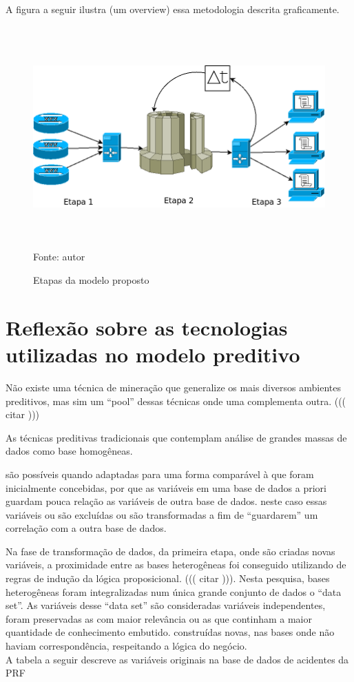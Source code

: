 A figura a seguir ilustra (um overview) essa metodologia descrita graficamente.

\begin{figure}[ht]
\centering
\caption{Etapas da modelo proposto}
\includegraphics[width=170mm, height=85mm]{Figuras/Cronograma/metodologiaGeral.png}\\
\tiny Fonte: autor
\end{figure}

\section{Reflexão sobre as tecnologias utilizadas no modelo preditivo}\label{result}

Não existe uma técnica de mineração que generalize os mais diversos ambientes preditivos, mas sim um ``pool'' 
dessas técnicas onde uma complementa outra. ((( citar )))

As técnicas preditivas tradicionais que contemplam análise de grandes massas de dados como base homogêneas.

são possíveis quando adaptadas para uma forma comparável à que
foram inicialmente concebidas, por que as variáveis em uma base de dados a priori guardam pouca relação as variáveis de outra base de dados.
neste caso essas variáveis ou são excluídas ou são transformadas a fim de ``guardarem'' um correlação com a outra base de dados. 

Na fase de transformação de dados, da primeira etapa, onde são criadas novas variáveis, a proximidade entre as
bases heterogêneas foi conseguido utilizando de regras de indução da lógica proposicional. ((( citar ))).
Nesta pesquisa, bases heterogêneas foram integralizadas num única grande conjunto de dados o ``data set''. As variáveis desse ``data set''
são consideradas variáveis independentes, foram preservadas as com maior relevância ou as que continham a maior quantidade de conhecimento
embutido.  construídas novas, nas bases onde não haviam correspondência, respeitando a lógica do negócio.\\
A tabela a seguir descreve as variáveis originais na base de dados de acidentes da PRF 


